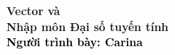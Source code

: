 \begin{frame}[noframenumbering]
    \thispagestyle{empty}
    \bfseries
    \begin{flushleft}
        \vfill
        \vspace{5mm}
        \textcolor{BlueDefault}{\huge \bfseries Vector và  \\Nhập môn Đại số tuyến tính} \\
        \vspace{8mm}
        \textcolor{black}{\large \bfseries Người trình bày: Carina }
        \vfill
    \end{flushleft}
\end{frame}